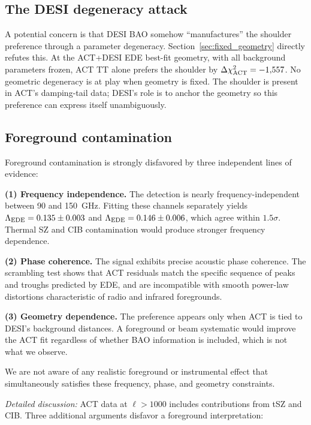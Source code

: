 \documentclass[onecolumn,showpacs,preprintnumbers,amsmath,amssymb,prd]{revtex4-2}
\begin{document}
\subsection{The DESI degeneracy attack}

A potential concern is that DESI BAO somehow ``manufactures'' the shoulder 
preference through a parameter degeneracy. Section~\ref{sec:fixed_geometry} 
directly refutes this. At the ACT+DESI EDE best-fit geometry, with all 
background parameters frozen, ACT TT alone prefers the shoulder by 
$\Delta\chi^2_{\rm ACT} = -1{,}557$. No geometric degeneracy is at play 
when geometry is fixed. The shoulder is present in ACT's damping-tail 
data; DESI's role is to anchor the geometry so this preference can 
express itself unambiguously.

\subsection{Foreground contamination}

Foreground contamination is strongly disfavored by three independent 
lines of evidence:

\textbf{(1) Frequency independence.} The detection is nearly 
frequency-independent between 90 and 150~GHz. Fitting these channels 
separately yields $\Lambda_{\rm EDE} = 0.135 \pm 0.003$ and 
$\Lambda_{\rm EDE} = 0.146 \pm 0.006$, which agree within $1.5\sigma$. 
Thermal SZ and CIB contamination would produce stronger frequency dependence.

\textbf{(2) Phase coherence.} The signal exhibits precise acoustic 
phase coherence. The scrambling test shows that ACT 
residuals match the specific sequence of peaks and troughs predicted 
by EDE, and are incompatible with smooth power-law distortions 
characteristic of radio and infrared foregrounds.

\textbf{(3) Geometry dependence.} The preference appears only when 
ACT is tied to DESI's background distances. A foreground or beam 
systematic would improve the ACT fit regardless of whether BAO 
information is included, which is not what we observe.

We are not aware of any realistic foreground or instrumental effect 
that simultaneously satisfies these frequency, phase, and geometry 
constraints.

\vspace{0.5em}
\noindent\textit{Detailed discussion:} ACT data at $\ell > 1000$ 
includes contributions from tSZ and CIB. Three additional arguments 
disfavor a foreground interpretation:
\end{document}
